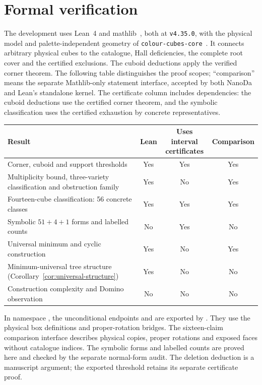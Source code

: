 \documentclass[11pt]{article}
\theoremstyle{remark}
\begin{document}






\section{Formal verification}\label{sec:formal}
The development uses Lean~4 and mathlib~\cite{Lean4,mathlib}, both at
\texttt{v4.35.0}, with the physical model and palette-independent geometry of
\texttt{colour-cubes-core}~\cite{ColourCubes}. It connects arbitrary physical
cubes to the catalogue, Hall deficiencies, the complete root cover and the
certified exclusions. The cuboid deductions apply the verified corner theorem.
The following table distinguishes the proof scopes; ``comparison'' means the
separate Mathlib-only statement interface, accepted by both NanoDa and Lean's
standalone kernel.
The certificate column includes dependencies: the cuboid deductions use the
certified corner theorem, and the symbolic classification uses the certified
exhaustion by concrete representatives.
\begin{center}
\small
\begin{tabular}{p{.52\linewidth}ccc}
\toprule
Result & Lean & \shortstack{Uses interval\\certificates} & Comparison\\
\midrule
Corner, cuboid and support thresholds & Yes & Yes & Yes\\
Multiplicity bound, three-variety classification and obstruction family & Yes & No & Yes\\
Fourteen-cube classification: 56 concrete classes & Yes & Yes & Yes\\
Symbolic $51+4+1$ forms and labelled counts & No & Yes & No\\
Universal minimum and cyclic construction & Yes & No & Yes\\
Minimum-universal tree structure (Corollary~\ref{cor:universal-structure}) & Yes & No & No\\
Construction complexity and Domino observation & No & No & No\\
\bottomrule
\end{tabular}
\end{center}
In namespace , the unconditional endpoints
 and  are exported
by . They use the physical box definitions and
proper-rotation bridges. The sixteen-claim comparison interface describes
physical copies, proper rotations and exposed faces without catalogue indices.
The symbolic forms and labelled counts are proved here
and checked by the separate normal-form audit. The deletion deduction is a
manuscript argument; the exported threshold retains its separate certificate proof.
\end{document}
